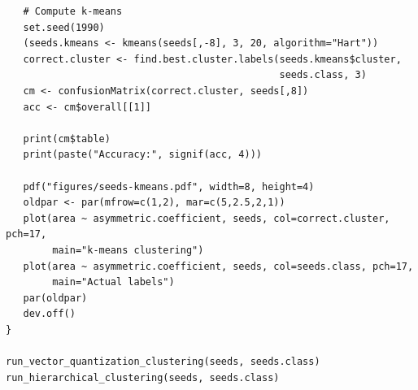\documentclass[12pt,article,oneside]{memoir}
\begin{document}
\begin{verbatim}
   # Compute k-means
   set.seed(1990)
   (seeds.kmeans <- kmeans(seeds[,-8], 3, 20, algorithm="Hart"))
   correct.cluster <- find.best.cluster.labels(seeds.kmeans$cluster,
                                               seeds.class, 3)
   cm <- confusionMatrix(correct.cluster, seeds[,8])
   acc <- cm$overall[[1]]
   
   print(cm$table)
   print(paste("Accuracy:", signif(acc, 4)))
   
   pdf("figures/seeds-kmeans.pdf", width=8, height=4)
   oldpar <- par(mfrow=c(1,2), mar=c(5,2.5,2,1))
   plot(area ~ asymmetric.coefficient, seeds, col=correct.cluster, pch=17,
        main="k-means clustering")
   plot(area ~ asymmetric.coefficient, seeds, col=seeds.class, pch=17,
        main="Actual labels")
   par(oldpar)
   dev.off()
}

run_vector_quantization_clustering(seeds, seeds.class)
run_hierarchical_clustering(seeds, seeds.class)
\end{verbatim}

%
%

\end{document}
